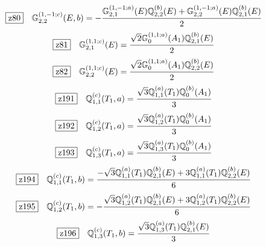 \documentclass[fleqn,10pt,landscape]{jsarticle}
\begin{document}
\begin{dmath*}
\hspace*{3mm}\fbox{z80}\quad \mathbb{G}_{2,2}^{(1,-1;c)}(E,b)=- \frac{\mathbb{G}_{2,1}^{(1,-1;a)}(E) \mathbb{Q}_{2,2}^{(b)}(E) + \mathbb{G}_{2,2}^{(1,-1;a)}(E) \mathbb{Q}_{2,1}^{(b)}(E)}{2}
\end{dmath*}
\begin{dmath*}
\hspace*{3mm}\fbox{z81}\quad \mathbb{G}_{2,1}^{(1,1;c)}(E)=\frac{\sqrt{2} \mathbb{G}_{0}^{(1,1;a)}(A_{1}) \mathbb{Q}_{2,1}^{(b)}(E)}{2}
\end{dmath*}
\begin{dmath*}
\hspace*{3mm}\fbox{z82}\quad \mathbb{G}_{2,2}^{(1,1;c)}(E)=\frac{\sqrt{2} \mathbb{G}_{0}^{(1,1;a)}(A_{1}) \mathbb{Q}_{2,2}^{(b)}(E)}{2}
\end{dmath*}
\begin{dmath*}
\hspace*{3mm}\fbox{z191}\quad \mathbb{Q}_{1,1}^{(c)}(T_{1},a)=\frac{\sqrt{3} \mathbb{Q}_{1,1}^{(a)}(T_{1}) \mathbb{Q}_{0}^{(b)}(A_{1})}{3}
\end{dmath*}
\begin{dmath*}
\hspace*{3mm}\fbox{z192}\quad \mathbb{Q}_{1,2}^{(c)}(T_{1},a)=\frac{\sqrt{3} \mathbb{Q}_{1,2}^{(a)}(T_{1}) \mathbb{Q}_{0}^{(b)}(A_{1})}{3}
\end{dmath*}
\begin{dmath*}
\hspace*{3mm}\fbox{z193}\quad \mathbb{Q}_{1,3}^{(c)}(T_{1},a)=\frac{\sqrt{3} \mathbb{Q}_{1,3}^{(a)}(T_{1}) \mathbb{Q}_{0}^{(b)}(A_{1})}{3}
\end{dmath*}
\begin{dmath*}
\hspace*{3mm}\fbox{z194}\quad \mathbb{Q}_{1,1}^{(c)}(T_{1},b)=\frac{- \sqrt{3} \mathbb{Q}_{1,1}^{(a)}(T_{1}) \mathbb{Q}_{2,1}^{(b)}(E) + 3 \mathbb{Q}_{1,1}^{(a)}(T_{1}) \mathbb{Q}_{2,2}^{(b)}(E)}{6}
\end{dmath*}
\begin{dmath*}
\hspace*{3mm}\fbox{z195}\quad \mathbb{Q}_{1,2}^{(c)}(T_{1},b)=- \frac{\sqrt{3} \mathbb{Q}_{1,2}^{(a)}(T_{1}) \mathbb{Q}_{2,1}^{(b)}(E) + 3 \mathbb{Q}_{1,2}^{(a)}(T_{1}) \mathbb{Q}_{2,2}^{(b)}(E)}{6}
\end{dmath*}
\begin{dmath*}
\hspace*{3mm}\fbox{z196}\quad \mathbb{Q}_{1,3}^{(c)}(T_{1},b)=\frac{\sqrt{3} \mathbb{Q}_{1,3}^{(a)}(T_{1}) \mathbb{Q}_{2,1}^{(b)}(E)}{3}
\end{dmath*}
\end{document}
